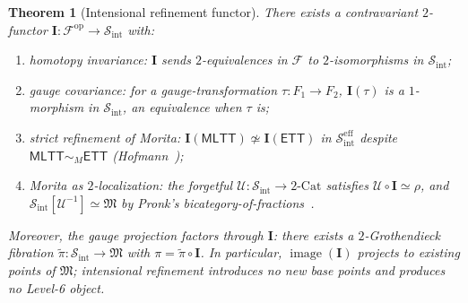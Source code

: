 \documentclass[11pt]{article}
\theoremstyle{plain}
\newtheorem{theorem}{Theorem}[section]
\theoremstyle{definition}
\newcommand{\cS}{\mathcal{S}}
\newcommand{\cF}{\mathcal{F}}
\newcommand{\cU}{\mathcal{U}}
\newcommand{\fM}{\mathfrak{M}}
\newcommand{\Sint}{\cS_{\mathrm{int}}}
\newcommand{\Cat}{\mathrm{Cat}}
\newcommand{\MLTT}{\mathsf{MLTT}}
\newcommand{\ETT}{\mathsf{ETT}}
\newcommand{\II}{\mathbf{I}}
\DeclareMathOperator{\image}{image}
\begin{document}
\begin{theorem}[Intensional refinement functor]\label{thm:intensional}
There exists a contravariant $2$-functor $\II : \cF^{\mathrm{op}} \to \Sint$ with:
\begin{enumerate}
\item[(I-1)] homotopy invariance: $\II$ sends $2$-equivalences in $\cF$ to $2$-isomorphisms in $\Sint$;
\item[(I-2)] gauge covariance: for a gauge-transformation $\tau : F_1 \to F_2$, $\II(\tau)$ is a $1$-morphism in $\Sint$, an equivalence when $\tau$ is;
\item[(I-3)] strict refinement of Morita: $\II(\MLTT) \not\simeq \II(\ETT)$ in $\Sint^{\mathrm{eff}}$ despite $\MLTT \sim_M \ETT$ (Hofmann~\cite{Hofmann1995});
\item[(I-4)] Morita as $2$-localization: the forgetful $\cU : \Sint \to 2\text{-}\Cat$ satisfies $\cU \circ \II \simeq \rho$, and $\Sint[\cU^{-1}] \simeq \fM$ by Pronk's bicategory-of-fractions~\cite{Pronk1996}.
\end{enumerate}
Moreover, the gauge projection factors through $\II$: there exists a $2$-Grothendieck fibration $\widetilde{\pi} : \Sint \to \fM$ with $\pi = \widetilde{\pi} \circ \II$. In particular, $\image(\II)$ projects to existing points of $\fM$; intensional refinement introduces no new base points and produces no Level-6 object.
\end{theorem}
\end{document}
